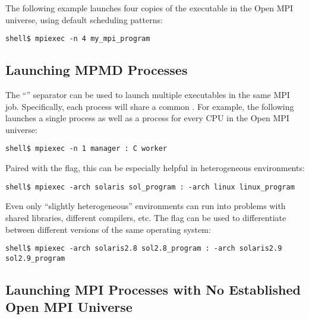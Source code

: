 The following example launches four copies of the
 executable in the Open MPI universe, using
default scheduling patterns:

\lstset{style=lam-cmdline}
\begin{lstlisting}
shell$ mpiexec -n 4 my_mpi_program
\end{lstlisting}


\subsection{Launching MPMD Processes}

The ``\cmdarg{:}'' separator can be used to launch multiple
executables in the same MPI job.  Specifically, each process will
share a common .  For example, the
following launches a single  process as well as a
 process for every CPU in the Open MPI universe:

\lstset{style=lam-cmdline}
\begin{lstlisting}
shell$ mpiexec -n 1 manager : C worker
\end{lstlisting}

Paired with the  flag, this can be especially helpful in
heterogeneous environments:

\lstset{style=lam-cmdline}
\begin{lstlisting}
shell$ mpiexec -arch solaris sol_program : -arch linux linux_program
\end{lstlisting}

Even only ``slightly heterogeneous'' environments can run into
problems with shared libraries, different compilers, etc.  The
 flag can be used to differentiate between different
versions of the same operating system:

\lstset{style=lam-cmdline}
\begin{lstlisting}
shell$ mpiexec -arch solaris2.8 sol2.8_program : -arch solaris2.9 sol2.9_program
\end{lstlisting}


\subsection{Launching MPI Processes with No Established Open MPI Universe}

